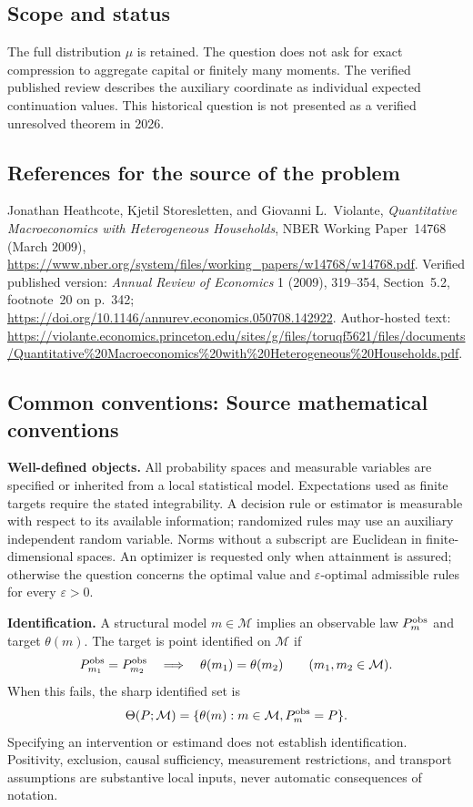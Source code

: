 \documentclass[11pt,a4paper]{article}
\begin{document}
\subsection*{Scope and status}
The full distribution $\mu$ is retained. The question does not ask for exact compression to aggregate capital or finitely many moments. The verified published review describes the auxiliary coordinate as individual expected continuation values. This historical question is not presented as a verified unresolved theorem in 2026.
\subsection*{References for the source of the problem}
Jonathan Heathcote, Kjetil Storesletten, and Giovanni L.~Violante, \emph{Quantitative Macroeconomics with Heterogeneous Households}, NBER Working Paper~14768 (March 2009), \url{https://www.nber.org/system/files/working_papers/w14768/w14768.pdf}. Verified published version: \emph{Annual Review of Economics} 1 (2009), 319--354, Section~5.2, footnote~20 on p.~342; \url{https://doi.org/10.1146/annurev.economics.050708.142922}. Author-hosted text: \url{https://violante.economics.princeton.edu/sites/g/files/toruqf5621/files/documents/Quantitative%20Macroeconomics%20with%20Heterogeneous%20Households.pdf}.

\subsection*{Common conventions: Source mathematical conventions}

\textbf{Well-defined objects.}
All probability spaces and measurable variables are specified or inherited
from a local statistical model. Expectations used as finite targets require
the stated integrability. A decision rule or estimator is measurable with
respect to its available information; randomized rules may use an auxiliary
independent random variable. Norms without a subscript are Euclidean in
finite-dimensional spaces. An optimizer is requested only when attainment
is assured; otherwise the question concerns the optimal value and
$\varepsilon$-optimal admissible rules for every $\varepsilon>0$.

\textbf{Identification.}
A structural model $m\in\mathcal M$ implies an observable law
$P_m^{\rm obs}$ and target $\theta(m)$. The target is point identified on
$\mathcal M$ if
\[
 P_{m_1}^{\rm obs}=P_{m_2}^{\rm obs}
 \quad\Longrightarrow\quad\theta(m_1)=\theta(m_2)
 \qquad(m_1,m_2\in\mathcal M).
\]
When this fails, the sharp identified set is
\[
 \Theta(P;\mathcal M)=\{\theta(m):m\in\mathcal M,
                                  P_m^{\rm obs}=P\}.
\]
Specifying an intervention or estimand does not establish identification.
Positivity, exclusion, causal sufficiency, measurement restrictions, and
transport assumptions are substantive local inputs, never automatic
consequences of notation.
\end{document}
